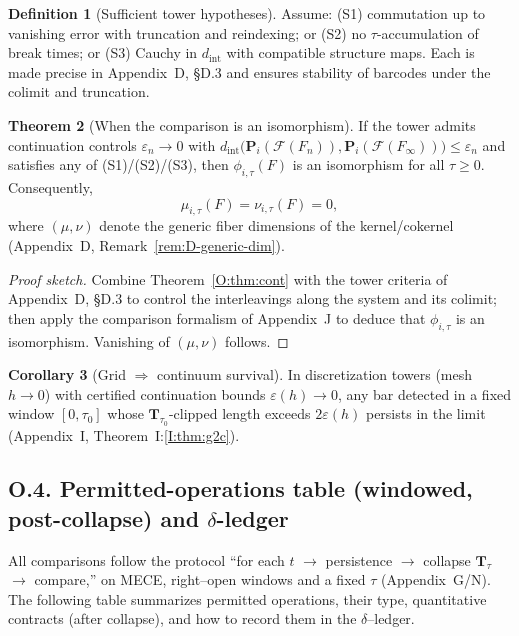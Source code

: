 \documentclass[11pt]{article}
\numberwithin{equation}{section}
\theoremstyle{plain}
\theoremstyle{definition}
\theoremstyle{remark}
\theoremstyle{plain}
\theoremstyle{definition}
\numberwithin{equation}{section}
\newtheorem{theorem}{Theorem}[section]
\newtheorem{corollary}[theorem]{Corollary}
\theoremstyle{definition}
\newtheorem{definition}[theorem]{Definition}
\numberwithin{equation}{section}
\theoremstyle{plain}
\theoremstyle{definition}
\theoremstyle{remark}
\begin{document}
\begin{definition}[Sufficient tower hypotheses]\label{O:def:tower-conds}
Assume: (S1) commutation up to vanishing error with truncation and reindexing; or (S2) no \(\tau\)-accumulation of break times; or (S3) Cauchy in \(d_{\mathrm{int}}\) with compatible structure maps. Each is made precise in Appendix~D, §D.3 and ensures stability of barcodes under the colimit and truncation.
\end{definition}

\begin{theorem}[When the comparison is an isomorphism]\label{O:thm:phi-iso}
If the tower admits continuation controls \(\varepsilon_n\to 0\) with
\(d_{\mathrm{int}}\!\big(\mathbf{P}_i(\mathcal{F}(F_n)),\mathbf{P}_i(\mathcal{F}(F_\infty))\big)\le \varepsilon_n\)
and satisfies any of (S1)/(S2)/(S3), then \(\phi_{i,\tau}(F)\) is an isomorphism for all \(\tau\ge 0\).
Consequently,
\[
\mu_{i,\tau}(F)=\nu_{i,\tau}(F)=0,
\]
where \((\mu,\nu)\) denote the generic fiber dimensions of the kernel/cokernel (Appendix~D, Remark~\ref{rem:D-generic-dim}).
\end{theorem}

\begin{proof}[Proof sketch]
Combine Theorem~\ref{O:thm:cont} with the tower criteria of Appendix~D, §D.3 to control the interleavings along the system and its colimit; then apply the comparison formalism of Appendix~J to deduce that \(\phi_{i,\tau}\) is an isomorphism. Vanishing of \((\mu,\nu)\) follows.
\end{proof}

\begin{corollary}[Grid \(\Rightarrow\) continuum survival]\label{O:cor:g2c}
In discretization towers (mesh \(h\to 0\)) with certified continuation bounds \(\varepsilon(h)\to 0\), any bar detected in a fixed window \([0,\tau_0]\) whose \(\mathbf{T}_{\tau_0}\)-clipped length exceeds \(2\varepsilon(h)\) persists in the limit (Appendix~I, Theorem~I:\ref{I:thm:g2c}).
\end{corollary}

\subsection*{O.4. Permitted-operations table (windowed, post-collapse) and $\delta$-ledger}
All comparisons follow the protocol “for each \(t\) \(\to\) persistence \(\to\) collapse \(\mathbf{T}_\tau\) \(\to\) compare,” on MECE, right–open windows and a fixed \(\tau\) (Appendix~G/N).
The following table summarizes permitted operations, their type, quantitative contracts (after collapse), and how to record them in the \(\delta\)–ledger.
\end{document}
